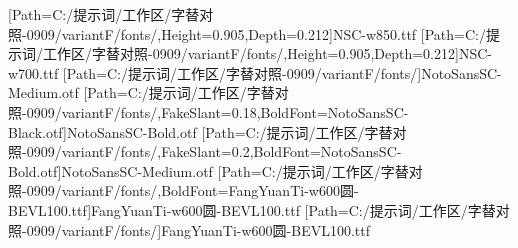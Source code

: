 \newfontfamily{\numbold}[Path=C:/提示词/工作区/字替对照-0909/variantF/fonts/,Height=0.905,Depth=0.212]{NSC-w850.ttf}
\newfontfamily{\numboldjian}[Path=C:/提示词/工作区/字替对照-0909/variantF/fonts/,Height=0.905,Depth=0.212]{NSC-w700.ttf}
\newfontfamily{\numpnum}[Path=C:/提示词/工作区/字替对照-0909/variantF/fonts/]{NotoSansSC-Medium.otf}
[Path=C:/提示词/工作区/字替对照-0909/variantF/fonts/,FakeSlant=0.18,BoldFont=NotoSansSC-Black.otf]{NotoSansSC-Bold.otf}
[Path=C:/提示词/工作区/字替对照-0909/variantF/fonts/,FakeSlant=0.2,BoldFont=NotoSansSC-Bold.otf]{NotoSansSC-Medium.otf}
[Path=C:/提示词/工作区/字替对照-0909/variantF/fonts/,BoldFont=FangYuanTi-w600圆-BEVL100.ttf]{FangYuanTi-w600圆-BEVL100.ttf}
\newfontfamily{\lilat}[Path=C:/提示词/工作区/字替对照-0909/variantF/fonts/]{FangYuanTi-w600圆-BEVL100.ttf}
\newcommand{\heiti}{\CJKfamily{hei}}
\newcommand{\heizhang}{\CJKfamily{heizhang}}
\newcommand{\heijie}{\CJKfamily{heijie}}
\newcommand{\hejie}{\CJKfamily{hejie}}
\newcommand{\hekeshi}{\CJKfamily{hekeshi}}
\newcommand{\libian}{\CJKfamily{libian}}
\newcommand{\libianb}{\CJKfamily{libianb}}
\newcommand{\libians}{\CJKfamily{libians}}
\newcommand{\heitiao}{\CJKfamily{heitiao}}
\newcommand{\heibf}{\CJKfamily{heibf}}
\newcommand{\heihao}{\CJKfamily{heihao}}
\newcommand{\heibian}{\CJKfamily{heibian}}
\newcommand{\huabf}{\CJKfamily{huabf}}
\newcommand{\lihei}{\CJKfamily{lihei}}
\newcommand{\kaishu}{\CJKfamily{kai}}
\newcommand{\fangsong}{\CJKfamily{fangsong}}%
